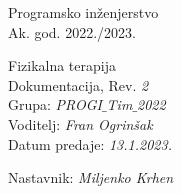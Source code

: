 \documentclass[12pt]{report}
\begin{document}
 
	
	
	
	\begin{titlepage}
		\begin{center}
			\LARGE Programsko inženjerstvo\\
			\large Ak. god. 2022./2023.\\
			
			
			\huge Fizikalna terapija\\
			\Large Dokumentacija, Rev. \textit{2}\\
			
			\normalsize 
			Grupa: \textit{PROGI$\_$Tim$\_$2022}\\
			Voditelj: \textit{Fran Ogrinšak}\\
			
			
			Datum predaje: \textit{13.1.2023.}\\
	
			
			Nastavnik: \textit{Miljenko Krhen}\\
		
		\end{center}

	
	\end{titlepage}

	
	\tableofcontents


	
	
	
	
	
	
	
	
	
	\begingroup
	\renewcommand*\listfigurename{Indeks slika i dijagrama}
	\listoffigures
	\endgroup


	
	\eject 
		
	
\end{document}
